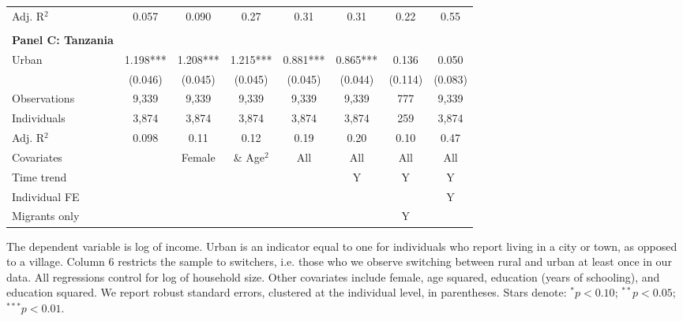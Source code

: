 \begin{table}[htbp]
\begin{threeparttable}
\begin{tabular}{l ccccccc}
Adj. R$^{2}$        &       0.057   &       0.090   &        0.27   &        0.31   &        0.31   &        0.22   &        0.55   \\
\cmidrule{2-8}
                    &               &               &               &               &               &               &               \\
\textbf{Panel C: Tanzania} \\
Urban               &       1.198***&       1.208***&       1.215***&       0.881***&       0.865***&       0.136   &       0.050   \\
                    &     (0.046)   &     (0.045)   &     (0.045)   &     (0.045)   &     (0.044)   &     (0.114)   &     (0.083)   \\
\addlinespace
Observations        &       9,339   &       9,339   &       9,339   &       9,339   &       9,339   &         777   &       9,339   \\
Individuals         &       3,874   &       3,874   &       3,874   &       3,874   &       3,874   &         259   &       3,874   \\
Adj. R$^{2}$        &       0.098   &        0.11   &        0.12   &        0.19   &        0.20   &        0.10   &        0.47   \\
\cmidrule{2-8} Covariates & & Female & \& Age$^2$ & All & All & All & All  \\ Time trend & & & & & Y & Y & Y  \\ Individual FE & & & & & & & Y  \\ Migrants only & & & & & & Y &  \\ \bottomrule \end{tabular} \begin{tablenotes} \footnotesize \item{The dependent variable is log of income. Urban is an indicator equal to one for individuals who report living in a city or town, as opposed to a village. Column 6 restricts the sample to switchers, i.e. those who we observe switching between rural and urban at least once in our data. All regressions control for log of household size. Other covariates include female, age squared, education (years of schooling), and education squared. We report robust standard errors, clustered at the individual level, in parentheses. Stars denote: $^{*} p<0.10$; $^{**} p<0.05$; $^{***} p<0.01$.} \end{tablenotes} \end{threeparttable} \end{table}
